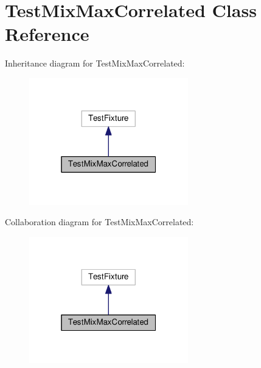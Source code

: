 \hypertarget{class_test_mix_max_correlated}{}\section{Test\+Mix\+Max\+Correlated Class Reference}
\label{class_test_mix_max_correlated}


Inheritance diagram for Test\+Mix\+Max\+Correlated\+:
\nopagebreak
\begin{figure}[H]
\begin{center}
\leavevmode
\includegraphics[width=196pt]{class_test_mix_max_correlated__inherit__graph}
\end{center}
\end{figure}


Collaboration diagram for Test\+Mix\+Max\+Correlated\+:
\nopagebreak
\begin{figure}[H]
\begin{center}
\leavevmode
\includegraphics[width=196pt]{class_test_mix_max_correlated__coll__graph}
\end{center}
\end{figure}
